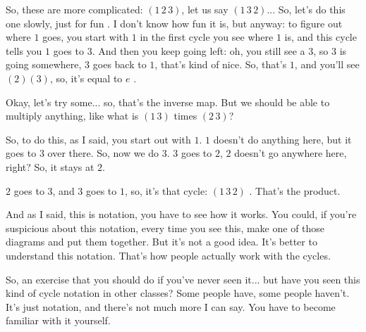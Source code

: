 \begin{speech}[01:12:31 - 01:14:49]
So, these are more complicated: $(1\,2\,3)$, let us say $(1\,3\,2)$... So, let's do this one slowly, just for fun . I don't know how fun it is, but anyway: to figure out where $1$ goes, you start with $1$ in the first cycle you see where $1$ is, and this cycle tells you $1$ goes to $3$. And then you keep going left: oh, you still see a $3$, so $3$ is going somewhere, $3$ goes back to $1$, that's kind of nice. So, that's $1$, and you'll see $(2)(3)$, so, it's equal to $e$ .

Okay, let's try some... so, that's the inverse map. But we should be able to multiply anything, like what is $(1\,3)$ times $(2\,3)$? 

So, to do this, as I said, you start out with $1$. $1$ doesn't do anything here, but it goes to $3$ over there. So, now we do $3$. $3$ goes to $2$, $2$ doesn't go anywhere here, right? So, it stays at $2$.

$2$ goes to $3$, and $3$ goes to $1$, so, it's that cycle: $(1\,3\,2)$ . That's the product.

And as I said, this is notation, you have to see how it works. You could, if you're suspicious about this notation, every time you see this, make one of those diagrams and put them together. But it's not a good idea. It's better to understand this notation. That's how people actually work with the cycles.

So, an exercise that you should do if you've never seen it... but have you seen this kind of cycle notation in other classes? Some people have, some people haven't. It's just notation, and there's not much more I can say. You have to become familiar with it yourself.
\end{speech}

